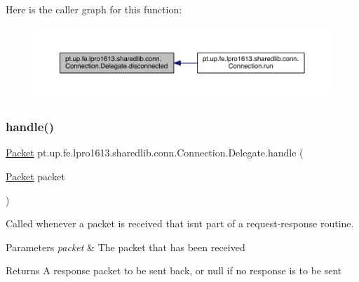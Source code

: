 Here is the caller graph for this function\+:
\nopagebreak
\begin{figure}[H]
\begin{center}
\leavevmode
\includegraphics[width=350pt]{interfacept_1_1up_1_1fe_1_1lpro1613_1_1sharedlib_1_1conn_1_1_connection_1_1_delegate_a39547a28a5b1818ca952e8d3d8da15ba_icgraph}
\end{center}
\end{figure}
\hypertarget{interfacept_1_1up_1_1fe_1_1lpro1613_1_1sharedlib_1_1conn_1_1_connection_1_1_delegate_a5b0f77e34d93967ae53cf7e01f0e2835}{}\label{interfacept_1_1up_1_1fe_1_1lpro1613_1_1sharedlib_1_1conn_1_1_connection_1_1_delegate_a5b0f77e34d93967ae53cf7e01f0e2835} 
\subsubsection{\texorpdfstring{handle()}{handle()}}
{\footnotesize\ttfamily \hyperlink{classpt_1_1up_1_1fe_1_1lpro1613_1_1sharedlib_1_1conn_1_1_packet}{Packet} pt.\+up.\+fe.\+lpro1613.\+sharedlib.\+conn.\+Connection.\+Delegate.\+handle (\begin{DoxyParamCaption}\item[{\hyperlink{classpt_1_1up_1_1fe_1_1lpro1613_1_1sharedlib_1_1conn_1_1_packet}{Packet}}]{packet }\end{DoxyParamCaption})}

Called whenever a packet is received that isn\textquotesingle{}t part of a request-\/response routine.


\begin{DoxyParams}{Parameters}
{\em packet} & The packet that has been received \\
\hline
\end{DoxyParams}
\begin{DoxyReturn}{Returns}
A response packet to be sent back, or null if no response is to be sent 
\end{DoxyReturn}


